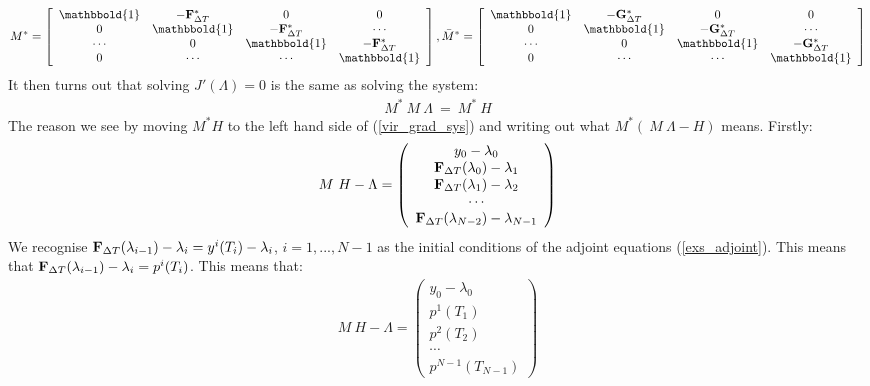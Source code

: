 \begin{align*}
M^*= \left[ \begin{array}{cccc}
   \mathbbold{1} & -\bold{F}_{\Delta T}^* & 0 & 0 \\  
   0 & \mathbbold{1} & -\bold{F}_{\Delta T}^* & \cdots \\ 
   \cdots &0 &  \mathbbold{1} & -\bold{F}_{\Delta T}^* \\
   0 &\cdots &\cdots &  \mathbbold{1}  \\
   \end{array}  \right],
\bar M^*= \left[ \begin{array}{cccc}
   \mathbbold{1} & -\bold{G}_{\Delta T}^* & 0 & 0 \\  
   0 & \mathbbold{1} & -\bold{G}_{\Delta T}^* & \cdots \\ 
   \cdots &0 &  \mathbbold{1} & -\bold{G}_{\Delta T}^* \\
   0 &\cdots &\cdots &  \mathbbold{1}  \\
   \end{array}  \right]
\end{align*}
It then turns out that solving $\hat{J}'(\Lambda)=0$ is the same as solving the system:
\begin{align}
M^* \ M \ \Lambda \ = \ M^* \ H \label{vir_grad_sys}
\end{align}
The reason we see by moving $M^*H$ to the left hand side of (\ref{vir_grad_sys}) and writing out what $M^*( \ M \ \Lambda-H)$ means. Firstly:
\begin{align}
M \ H-\Lambda  = \left( \begin{array}{c}
	y_0-\lambda_0  \\
	 \bold{F}_{\Delta T}(\lambda_0)-\lambda_1 \\
	 \bold{F}_{\Delta T}(\lambda_1)-\lambda_2  \\
	\cdots \\
	\bold{F}_{\Delta T}(\lambda_{N-2})-\lambda_{N-1} 
	\end{array} \right)
\end{align}
We recognise $\bold{F}_{\Delta T}(\lambda_{i-1})-\lambda_i=y^i(T_i) -\lambda_i$, $i=1,...,N-1$ as the initial conditions of the adjoint equations (\ref{exs_adjoint}). This means that $\bold{F}_{\Delta T}(\lambda_{i-1})-\lambda_i=p^i(T_i)$. This means that: 
\begin{align}
M \ H-\Lambda  = \left( \begin{array}{c}
	y_0-\lambda_0  \\
	 p^1(T_1) \\
	 p^2( T_2) \\
	\cdots \\
	p^{N-1}(T_{N-1}) 
	\end{array} \right)
\end{align}
